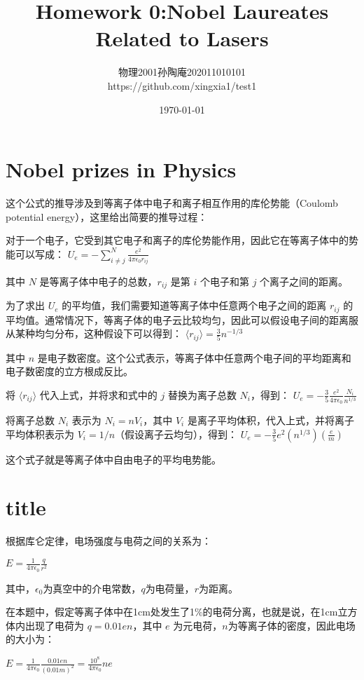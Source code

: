 \documentclass[12pt, a4paper, oneside]{ctexart}
\title{Homework 0:Nobel Laureates Related to Lasers}
\date{\today}
\author{物理2001孙陶庵202011010101\\https://github.com/xingxia1/test1}
\begin{document}
\begin{spacing}{2.0}
\maketitle


\section{Nobel prizes in Physics}

这个公式的推导涉及到等离子体中电子和离子相互作用的库伦势能（Coulomb potential energy），这里给出简要的推导过程：

对于一个电子，它受到其它电子和离子的库伦势能作用，因此它在等离子体中的势能可以写成：
$U_e = - \sum_{i \neq j}^N \frac{e^2}{4 \pi \epsilon_0 r_{ij}}$

其中 $N$ 是等离子体中电子的总数，$r_{ij}$ 是第 $i$ 个电子和第 $j$ 个离子之间的距离。

为了求出 $U_e$ 的平均值，我们需要知道等离子体中任意两个电子之间的距离 $r_{ij}$ 的平均值。通常情况下，等离子体的电子云比较均匀，因此可以假设电子间的距离服从某种均匀分布，这种假设下可以得到：
$\langle r_{ij} \rangle = \frac{3}{5} n^{-1/3}$

其中 $n$ 是电子数密度。这个公式表示，等离子体中任意两个电子间的平均距离和电子数密度的立方根成反比。

将 $\langle r_{ij} \rangle$ 代入上式，并将求和式中的 $j$ 替换为离子总数 $N_i$，得到：
$U_e = - \frac{3}{5} \frac{e^2}{4 \pi \epsilon_0} \frac{N_i}{n^{1/3}}$

将离子总数 $N_i$ 表示为 $N_i = n V_i$，其中 $V_i$ 是离子平均体积，代入上式，并将离子平均体积表示为 $V_i = 1/n$（假设离子云均匀），得到：
$U_e = - \frac{3}{5} e^2 (n^{1/3}) (\frac{e}{m})$

这个式子就是等离子体中自由电子的平均电势能。
\section[short]{title}
根据库仑定律，电场强度与电荷之间的关系为：

$E = \frac{1}{4\pi\epsilon_0}\frac{q}{r^2}$

其中，$\epsilon_0$为真空中的介电常数，$q$为电荷量，$r$为距离。

在本题中，假定等离子体中在1cm处发生了1$\%$的电荷分离，也就是说，在1cm立方体内出现了电荷为 $q = 0.01en$，其中 $e$ 为元电荷，$n$为等离子体的密度，因此电场的大小为：

$E = \frac{1}{4\pi\epsilon_0}\frac{0.01en}{(0.01m)^2} = \frac{10^8}{4\pi\epsilon_0}ne$


\end{spacing}
\end{document}
